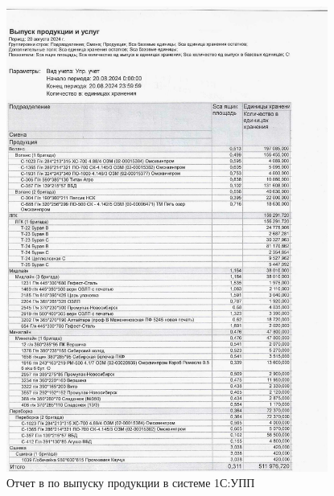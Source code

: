  \begin{figure}
\begin{center}
  \includegraphics[height=0.94\textheight, width=0.94\textwidth, keepaspectratio]{Pics 1/0 Отчет выпуск продукции и услуг_0001.jpg}
\end{center}
  \caption{Отчет в по выпуску продукции в системе 1С:УПП}
  \label{pic:0 Отчет выпуск продукции и услуг_0001}
\end{figure}

